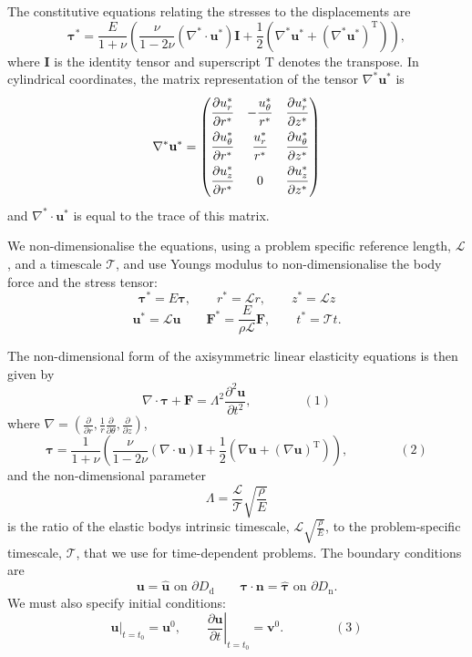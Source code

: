 The constitutive equations relating the stresses to the displacements are \[ \bm{\tau}^* = \frac{E}{1+\nu}\left(\frac{\nu}{1-2\nu}\left(\nabla^*\cdot\mathbf{u}^*\right) \mathbf{I} + \frac{1}{2}\left(\nabla^*\mathbf{u}^* + \left(\nabla^*\mathbf{u}^*\right)^\mathrm{T}\right)\right), \] where $ \mathbf{I} $ is the identity tensor and superscript $ \mathrm{T} $ denotes the transpose. In cylindrical coordinates, the matrix representation of the tensor $ \nabla^*\mathbf{u}^* $ is \[ \nabla^*\mathbf{u}^* = \begin{pmatrix} \dfrac{\strut \partial u_r^*}{\strut \partial r^*} & -\dfrac{\strut u_\theta^*}{\strut r^*} & \dfrac{\strut \partial u_r^*}{\strut \partial z^*}\\ \dfrac{\strut \partial u_\theta^*}{\strut \partial r^*} & \dfrac{\strut u_r^*}{\strut r^*} & \dfrac{\strut \partial u_\theta^*}{\strut \partial z^*}\\ \dfrac{\strut \partial u_z^*}{\strut \partial r^*} & 0 & \dfrac{\strut \partial u_z^*}{\strut \partial z^*} \end{pmatrix} \] and $ \nabla^*\cdot \mathbf{u}^* $ is equal to the trace of this matrix.

We non-\/dimensionalise the equations, using a problem specific reference length, $ \mathcal{L} $, and a timescale $ \mathcal{T} $, and use Young\textquotesingle{}s modulus to non-\/dimensionalise the body force and the stress tensor\+: \[ \bm{\tau}^* = E \bm{\tau}, \qquad r^* = \mathcal{L}r, \qquad z^* = \mathcal{L}z \] \[ \mathbf{u}^* = \mathcal{L} \mathbf{u} \qquad \mathbf{F}^* = \frac{E}{\rho \mathcal{L}}\mathbf{F}, \qquad t^* = \mathcal{T}t. \]

The non-\/dimensional form of the axisymmetric linear elasticity equations is then given by \[ \nabla\cdot \bm{\tau} + \mathbf{F} = \Lambda^2\frac{\partial^2\mathbf{u}} {\partial t^2},\qquad\qquad (1) \] where $ \nabla = \left(\frac{\partial}{\partial r}, \frac{1}{r}\frac{\partial} {\partial \theta},\frac{\partial}{\partial z}\right) $, \[ \bm{\tau} = \frac{1}{1+\nu}\left(\frac{\nu}{1-2\nu}\left(\nabla\cdot\mathbf{u}\right) \mathbf{I} + \frac{1}{2}\left(\nabla\mathbf{u} + \left(\nabla\mathbf{u}\right)^\mathrm{T}\right)\right),\qquad\qquad (2) \] and the non-\/dimensional parameter \[ \Lambda = \frac{\mathcal{L}}{\mathcal{T}}\sqrt{\frac{\rho}{E}} \] is the ratio of the elastic body\textquotesingle{}s intrinsic timescale, $ \mathcal{L} \sqrt{\frac{\rho}{E}} $, to the problem-\/specific timescale, $ \mathcal{T} $, that we use for time-\/dependent problems. The boundary conditions are \[ \mathbf{u} = \hat{\mathbf{u}}\text{ on } \partial D_\mathrm{d}\qquad \bm{\tau}\cdot\mathbf{n} = \hat{\bm{\tau}}\text{ on } \partial D_\mathrm{n}. \] We must also specify initial conditions\+: \[ \left.\mathbf{u}\right|_{t=t_0} = \mathbf{u}^0,\qquad \left.\frac{\partial\mathbf{u}}{\partial t}\right|_{t=t_0} = \mathbf{v}^0.\qquad\qquad (3) \]



